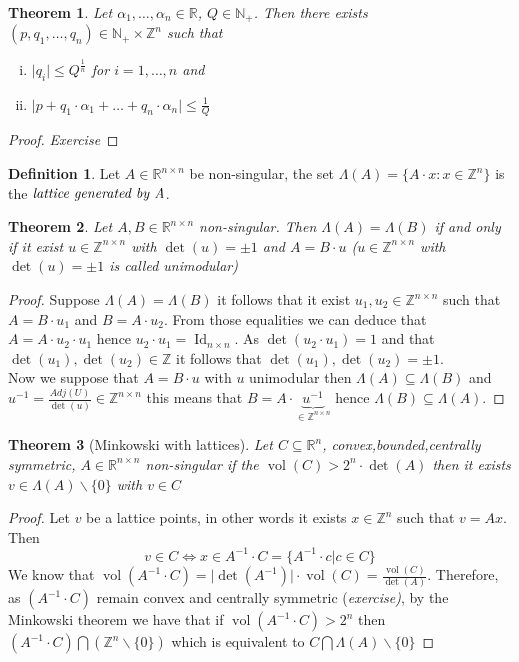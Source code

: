 \documentclass[a4paper,11pt,american]{article}
\newcommand{\N}{\mathbb{N}}
\newcommand{\R}{\mathbb{R}}
\newcommand{\Z}{\mathbb{Z}}
\DeclareMathOperator{\vol}{vol}
\DeclareMathOperator{\Id}{Id}
\theoremstyle{plain}
\newtheorem{theorem}{Theorem}
\theoremstyle{definition}
\newtheorem{definition}{Definition}
\begin{document}
\begin{theorem}
    Let $\alpha_1,\dots,\alpha_n\in\R$, $Q\in\N_+$. Then there exists $(p,q_1,\dots,q_n)\in\N_+\times\Z^n$ such that
    \begin{enumerate}[i)]
        \item $\vert q_i\vert\leq Q^{\frac{1}{n}}$ for $i=1,\dots,n$ and
        \item $\vert p+q_1\cdot\alpha_1+\dots +q_n\cdot\alpha_n \vert\leq \frac{1}{Q}$
    \end{enumerate}
\end{theorem}
\begin{proof}
    \emph{Exercise}
\end{proof}
\begin{definition}
    Let $A\in\R^{n\times n}$ be non-singular, the set $\Lambda(A)=\{A\cdot x:x\in\Z^n\}$ is the $\emph{lattice generated by A}$.
\end{definition}
\begin{theorem}
    Let $A,B\in\R^{n\times n}$ non-singular. Then $\Lambda(A)=\Lambda(B)$ \emph{if and only if} it exist $u\in\Z^{n \times n}$ with $\det(u)=\pm 1$ and $A=B\cdot u$ ($u\in\Z^{n \times n}$ with $\det(u)=\pm 1$ is called \emph{unimodular})
\end{theorem}
\begin{proof}
    Suppose $\Lambda(A)=\Lambda(B)$ it follows that it exist $u_1,u_2\in \Z^{n\times n}$ such that $A=B\cdot u_1$ and $B=A\cdot u_2$. From those equalities we can deduce that $A=A\cdot u_2\cdot u_1$ hence $u_2\cdot u_1=\Id_{n\times n}$. As $\det (u_2\cdot u_1)=1$ and that $\det(u_1),\det(u_2)\in\Z$ it follows that $\det(u_1),\det(u_2)=\pm 1$.\\
    Now we suppose that $A=B\cdot u$ with $u$ unimodular then $\Lambda(A)\subseteq\Lambda (B)$ and $u^{-1}=\frac{Adj(U)}{\det(u)}\in \Z^{n\times n}$ this means that $B=A\cdot \underbrace{u^{-1}}_{\in\Z^{n\times n}}$ hence $\Lambda(B)\subseteq \Lambda(A)$.
\end{proof}
\begin{theorem}[Minkowski with lattices]
Let $C\subseteq \R^n$, convex,bounded,centrally symmetric, $A\in\R^{n \times n}$ non-singular if the $\vol(C)>2^n\cdot\det(A)$ then it exists $v\in\Lambda(A)\backslash\{0\}$ with $v\in C$
\end{theorem}
\begin{proof}
    Let $v$ be a lattice points, in other words it exists $x\in\Z^n$ such that $v=Ax$. Then $$v\in C\iff x\in A^{-1}\cdot C= \{A^{-1}\cdot c\vert c\in C\}$$
   We know that $\vol(A^{-1}\cdot C)=\vert \det(A^{-1})\vert\cdot\vol(C)=\frac{
\vol(C)}{\det(A)}$. Therefore, as $(A^{-1}\cdot C)$ remain convex and centrally symmetric (\emph{exercise)}, by the Minkowski theorem we have that if $\vol (A^{-1}\cdot C)> 2^n$ then $(A^{-1}\cdot C)\bigcap(\Z^n\backslash\{0\})$ which is equivalent to $C\bigcap\Lambda(A)\backslash\{0\}$
\end{proof}
\end{document}
